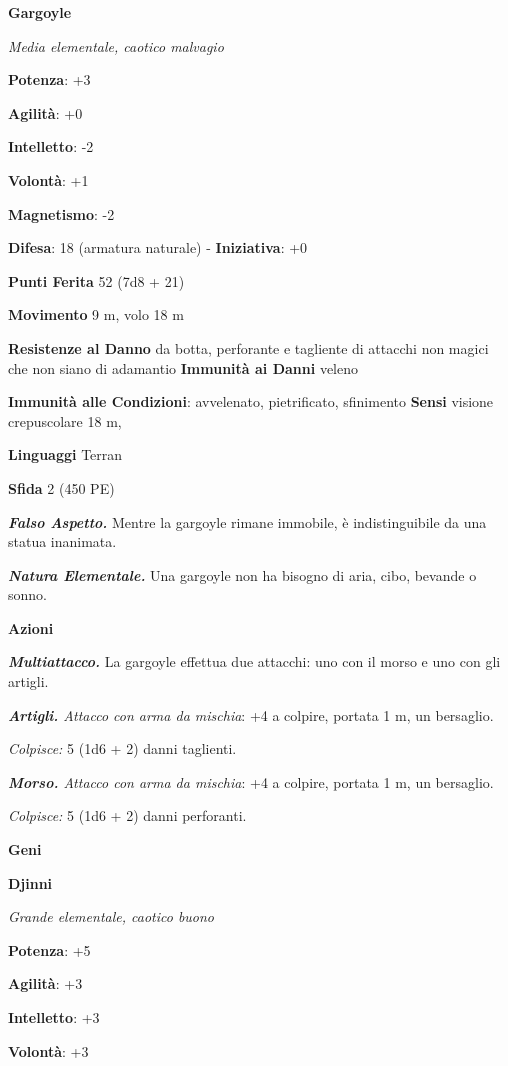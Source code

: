 \begin{multicols}{2}
\textbf{Gargoyle}

\emph{Media elementale, caotico malvagio}

\textbf{Potenza}: +3

\textbf{Agilità}: +0

\textbf{Intelletto}: -2

\textbf{Volontà}: +1

\textbf{Magnetismo}: -2

\textbf{Difesa}: 18 (armatura naturale) - \textbf{Iniziativa}: +0

\textbf{Punti Ferita} 52 (7d8 + 21)

\textbf{Movimento} 9 m, volo 18 m

\textbf{Resistenze al Danno} da botta, perforante e tagliente di
attacchi non magici che non siano di adamantio \textbf{Immunità ai
Danni} veleno

\textbf{Immunità alle Condizioni}: avvelenato, pietrificato, sfinimento
\textbf{Sensi} visione crepuscolare 18 m, 

\textbf{Linguaggi} Terran

\textbf{Sfida} 2 (450 PE)\smallskip

\emph{\textbf{Falso Aspetto.}} Mentre la gargoyle rimane immobile, è
indistinguibile da una statua inanimata.

\emph{\textbf{Natura Elementale.}} Una gargoyle non ha bisogno di aria,
cibo, bevande o sonno.

\smallskip\textbf{Azioni}

\emph{\textbf{Multiattacco.}} La gargoyle effettua due attacchi: uno con
il morso e uno con gli artigli.

\emph{\textbf{Artigli.} Attacco con arma da mischia}: +4 a colpire,
portata 1 m, un bersaglio.

\emph{Colpisce:} 5 (1d6 + 2) danni taglienti.

\emph{\textbf{Morso.} Attacco con arma da mischia}: +4 a colpire,
portata 1 m, un bersaglio.

\emph{Colpisce:} 5 (1d6 + 2) danni perforanti.



\textbf{Geni}

\textbf{Djinni}

\emph{Grande elementale, caotico buono}

\textbf{Potenza}: +5

\textbf{Agilità}: +3

\textbf{Intelletto}: +3

\textbf{Volontà}: +3


\end{multicols}
